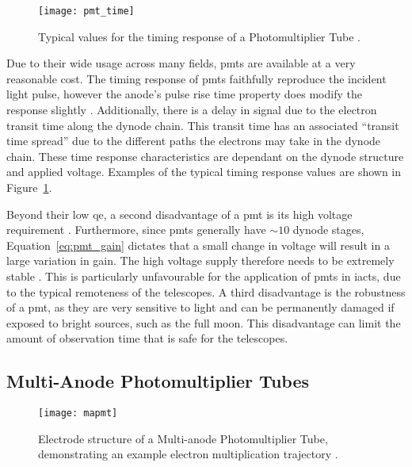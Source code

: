 \begin{figure}
	\centering
    \texttt{[image: pmt\_time]} 
	\caption[Photomultiplier Tube timing characteristics.]{Typical values for the timing response of a Photomultiplier Tube \cite{Hamamatsu2016}.}
	\label{fig:pmt_time}
\end{figure}

Due to their wide usage across many fields, \glspl{pmt} are available at a very reasonable cost. The timing response of \glspl{pmt} faithfully reproduce the incident light pulse, however the anode's pulse rise time property does modify the response slightly \cite{Hamamatsu2016}. Additionally, there is a delay in signal due to the electron transit time along the dynode chain. This transit time has an associated ``transit time spread'' due to the different paths the electrons may take in the dynode chain. These time response characteristics are dependant on the dynode structure and applied voltage. Examples of the typical timing response values are shown in Figure~\ref{fig:pmt_time}.

Beyond their low \gls{qe}, a second disadvantage of a \gls{pmt} is its high voltage requirement \cite{Weekes2003}. Furthermore, since \glspl{pmt} generally have $\sim 10$ dynode stages, Equation~\ref{eq:pmt_gain} dictates that a small change in voltage will result in a large variation in gain. The high voltage supply therefore needs to be extremely stable \cite{Hamamatsu2016}. This is particularly unfavourable for the application of \glspl{pmt} in \glspl{iact}, due to the typical remoteness of the telescopes. A third disadvantage is the robustness of a \gls{pmt}, as they are very sensitive to light and can be permanently damaged if exposed to bright sources, such as the full moon. This disadvantage can limit the amount of observation time that is safe for the telescopes.

\subsection{Multi-Anode Photomultiplier Tubes}

\begin{figure}
	\centering
    \texttt{[image: mapmt]} 
	\caption[Internals of a Multi-anode Photomultiplier Tube.]{Electrode structure of a Multi-anode Photomultiplier Tube, demonstrating an example electron multiplication trajectory \cite{HAMAMATSU2007}.}
	\label{fig:mapmt}
\end{figure}

